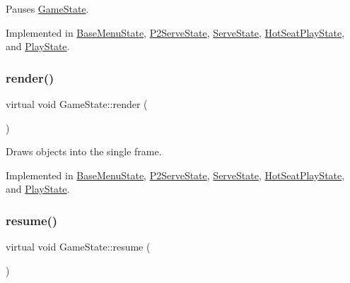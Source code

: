 Pauses \mbox{\hyperlink{class_game_state}{Game\+State}}. 



Implemented in \mbox{\hyperlink{class_base_menu_state_a3ac8e688220c609b467ca4ae4c6600d6}{Base\+Menu\+State}}, \mbox{\hyperlink{class_p2_serve_state_aa72fcf3306cf089d1efc7122a8147139}{P2\+Serve\+State}}, \mbox{\hyperlink{class_serve_state_ab3a85411b4cc260cfede50e3aa10573c}{Serve\+State}}, \mbox{\hyperlink{class_hot_seat_play_state_af0e96c626d63f71e714bbf8119308751}{Hot\+Seat\+Play\+State}}, and \mbox{\hyperlink{class_play_state_a5c135eed71fd8dbf30b75e577c28ad0d}{Play\+State}}.

\mbox{\label{class_game_state_a0d56cd5355f59a87cf95e1c6d719f329}} 
\subsubsection{\texorpdfstring{render()}{render()}}
{\footnotesize\ttfamily virtual void Game\+State\+::render (\begin{DoxyParamCaption}\item[{\mbox{\hyperlink{class_game_engine}{Game\+Engine}} $\ast$}]{ }\end{DoxyParamCaption})\hspace{0.3cm}{\ttfamily [pure virtual]}}



Draws objects into the single frame. 



Implemented in \mbox{\hyperlink{class_base_menu_state_a404076aa3e789fa75ba1bfe7752c1e18}{Base\+Menu\+State}}, \mbox{\hyperlink{class_p2_serve_state_acc6d131c7a5712a643b7f97c3bcdbd46}{P2\+Serve\+State}}, \mbox{\hyperlink{class_serve_state_a91cd889069e5b9f073ac33addeed2913}{Serve\+State}}, \mbox{\hyperlink{class_hot_seat_play_state_a66bbc19d0a2046a3ff2d926669d0ae26}{Hot\+Seat\+Play\+State}}, and \mbox{\hyperlink{class_play_state_a186b8cb25c420e2ce54002bcb08d8bee}{Play\+State}}.

\mbox{\label{class_game_state_a4a421c44f4dae6e9a4fbe10b6e8c47ac}} 
\subsubsection{\texorpdfstring{resume()}{resume()}}
{\footnotesize\ttfamily virtual void Game\+State\+::resume (\begin{DoxyParamCaption}{ }\end{DoxyParamCaption})\hspace{0.3cm}{\ttfamily [pure virtual]}}



